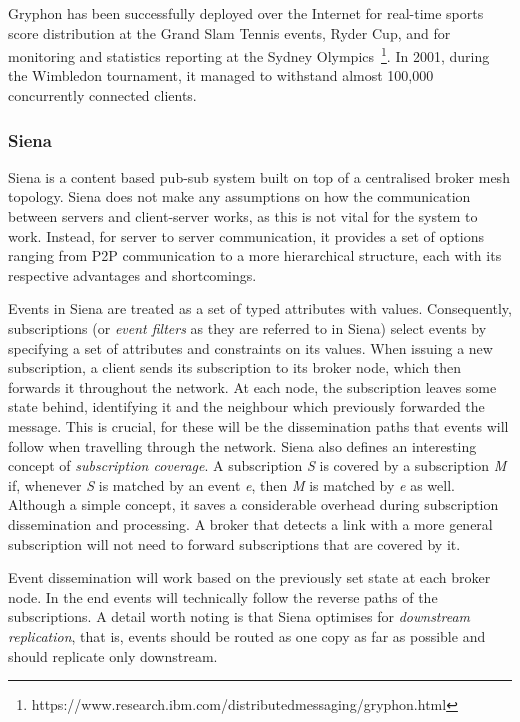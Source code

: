 Gryphon has been successfully deployed over the Internet for real-time
sports score distribution at the Grand Slam Tennis events, Ryder Cup,
and for monitoring and statistics reporting at the Sydney Olympics~\footnote{https://www.research.ibm.com/distributedmessaging/gryphon.html}.
In 2001, during the Wimbledon tournament, it managed to withstand almost
100,000 concurrently connected clients.

\subsubsection{Siena}\label{siena}

Siena \cite{Carzaniga2003} is a content based pub-sub system built
on top of a centralised broker mesh topology. Siena does not make any
assumptions on how the communication between servers and client-server
works, as this is not vital for the system to work. Instead, for server
to server communication, it provides a set of options ranging from P2P
communication to a more hierarchical structure, each with its respective
advantages and shortcomings.

Events in Siena are treated as a set of typed attributes with values.
Consequently, subscriptions (or \emph{event filters} as they are
referred to in Siena) select events by specifying a set of attributes
and constraints on its values. When issuing a new subscription, a client
sends its subscription to its broker node, which then forwards it
throughout the network. At each node, the subscription leaves some state
behind, identifying it and the neighbour which previously forwarded the
message. This is crucial, for these will be the dissemination paths that
events will follow when travelling through the network. Siena also
defines an interesting concept of \emph{subscription coverage}. A
subscription \emph{S} is covered by a subscription \emph{M} if, whenever
\emph{S} is matched by an event \emph{e}, then \emph{M} is matched by
\emph{e} as well. Although a simple concept, it saves a considerable
overhead during subscription dissemination and processing. A broker that
detects a link with a more general subscription will not need to forward
subscriptions that are covered by it.

Event dissemination will work based on the previously set state at each
broker node. In the end events will technically follow the reverse paths
of the subscriptions. A detail worth noting is that Siena optimises for
\emph{downstream replication}, that is, events should be routed as one
copy as far as possible and should replicate only downstream.

